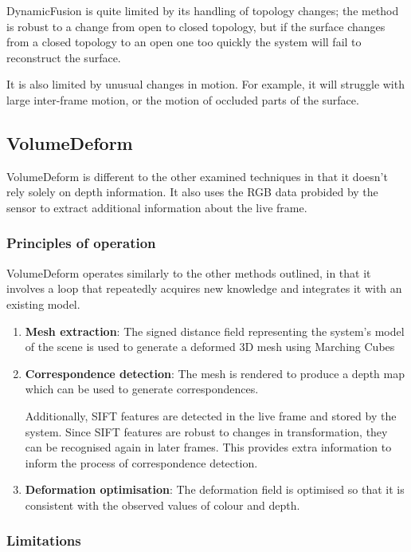 \documentclass[a4paper]{article}
\begin{document}
DynamicFusion is quite limited by its handling of topology changes; the method is robust to a change from open to closed topology, but if the surface changes from a closed topology to an open one too quickly the system will fail to reconstruct the surface.

It is also limited by unusual changes in motion. For example, it will struggle with large inter-frame motion, or the motion of occluded parts of the surface.


\subsection{VolumeDeform}

VolumeDeform\cite{volumedeform} is different to the other examined techniques in that it doesn't rely solely on depth information. It also uses the RGB data probided by the sensor to extract additional information about the live frame.\\ 


\subsubsection{Principles of operation}

VolumeDeform operates similarly to the other methods outlined, in that it involves a loop that repeatedly acquires new knowledge and integrates it with an existing model.

\begin{enumerate}
\item \textbf{Mesh extraction}: The signed distance field representing the system's model of the scene is used to generate a deformed 3D mesh using Marching Cubes
\item \textbf{Correspondence detection}: The mesh is rendered to produce a depth map which can be used to generate correspondences. 

Additionally, SIFT features are detected in the live frame and stored by the system. Since SIFT features are robust to changes in transformation, they can be recognised again in later frames. This provides extra information to inform the process of correspondence detection. 

\item \textbf{Deformation optimisation}: The deformation field is optimised so that it is consistent with the observed values of colour and depth.
\end{enumerate}

\subsubsection{Limitations}
\end{document}

